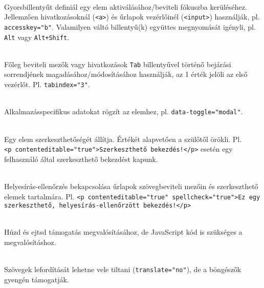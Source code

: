 \begin{frame}
  \begin{description}[m]
    \item[\texttt{accesskey}] \hfill \\ Gyorsbillentyűt definiál egy elem aktiválásához/beviteli fókuszba kerüléséhez. Jellemzően hivatkozásoknál (\texttt{<a>}) és űrlapok vezérlőinél (\texttt{<input>}) használják, pl. \texttt{accesskey="b"}. Valamilyen váltó billentyű(k) együttes megnyomását igényli, pl. \texttt{Alt} vagy \texttt{Alt+Shift}.
    \item[\texttt{tabindex}] \hfill \\ Főleg beviteli mezők vagy hivatkozások \texttt{Tab} billentyűvel történő bejárási sorrendjének magadásához/módosításához használják, az 1 érték jelöli az első vezérlőt. Pl. \texttt{tabindex="3"}.
    \item[\texttt{data-*}] \hfill \\ Alkalmazásspecifikus adatokat rögzít az elemhez, pl. \texttt{data-toggle="modal"}.
  \end{description}
\end{frame}

\begin{frame}
  \begin{description}[m]
    \small
    \item[\texttt{contenteditable}] \hfill \\ Egy elem szerkeszthetőségét állítja. Értékét alapvetően a szülőtől örökli. Pl.\\ \texttt{<p contenteditable="true">Szerkeszthető bekezdés!</p>} esetén egy felhasználó által szerkeszthető bekezdést kapunk.
    \item[\texttt{spellcheck}] \hfill \\ Helyesírás-ellenőrzés bekapcsolása űrlapok szövegbeviteli mezőin és szerkeszthető elemek tartalmára. Pl. \texttt{<p contenteditable="true" spellcheck="true">Ez egy szerkeszthető, helyesírás-ellenőrzött bekezdés!</p>}
    \item[\texttt{draggable, dropzone}] \hfill \\ Húzd és ejtsd támogatás megvalósításához, de JavaScript kód is szükséges a megvalósításhoz.
    \item[\texttt{translate}] \hfill \\ Szövegek lefordítását lehetne vele tiltani (\texttt{translate="no"}), de a böngészők gyengén támogatják.
  \end{description}
\end{frame}
